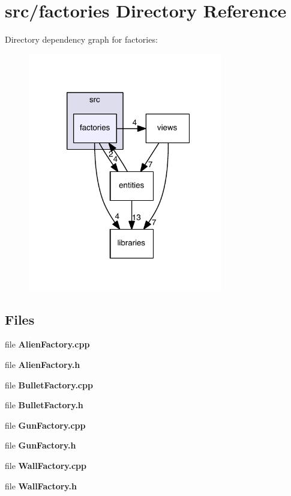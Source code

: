 \section{src/factories Directory Reference}
\label{dir_9c074b8a3ff180fe0f5e8e7bda80dc8f}
Directory dependency graph for factories\-:\nopagebreak
\begin{figure}[H]
\begin{center}
\leavevmode
\includegraphics[width=241pt]{dir_9c074b8a3ff180fe0f5e8e7bda80dc8f_dep}
\end{center}
\end{figure}
\subsection*{Files}
\begin{DoxyCompactItemize}
\item 
file {\bf Alien\-Factory.\-cpp}
\item 
file {\bf Alien\-Factory.\-h}
\item 
file {\bf Bullet\-Factory.\-cpp}
\item 
file {\bf Bullet\-Factory.\-h}
\item 
file {\bf Gun\-Factory.\-cpp}
\item 
file {\bf Gun\-Factory.\-h}
\item 
file {\bf Wall\-Factory.\-cpp}
\item 
file {\bf Wall\-Factory.\-h}
\end{DoxyCompactItemize}
